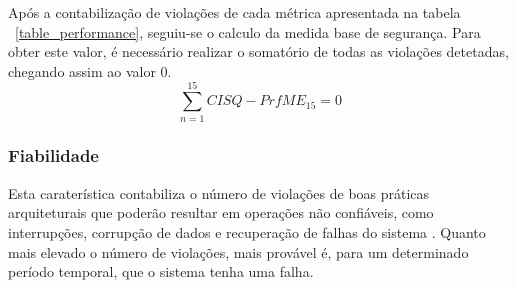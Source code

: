 \documentclass[openany,10pt,a4paper]{article}
\begin{document}
Após a contabilização de violações de cada métrica apresentada na tabela ~\ref{table_performance}, seguiu-se o calculo da medida base de segurança. Para obter este valor, é necessário realizar o somatório de todas as violações detetadas, chegando assim ao valor 0.
$$\sum_{n=1}^{15} CISQ - PrfME_{15} = 0$$

\subsubsection{Fiabilidade}
Esta caraterística contabiliza o número de violações de boas práticas arquiteturais que poderão resultar em operações não confiáveis, como interrupções, corrupção de dados e recuperação de falhas do sistema \cite{OMG_Reliability}. Quanto mais elevado o número de violações, mais provável é, para um determinado período temporal, que o sistema tenha uma falha. 
\end{document}
